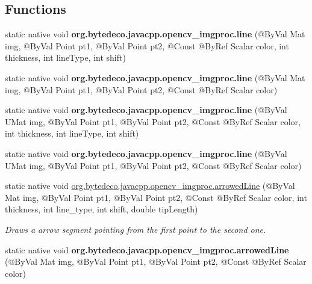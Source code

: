 \subsection*{Functions}
\begin{DoxyCompactItemize}
\item 
\mbox{\label{group__imgproc__draw_ga09dfe9f2e6b788aa42a900719ec2bb80}} 
static native void {\bfseries org.\+bytedeco.\+javacpp.\+opencv\+\_\+imgproc.\+line} (@By\+Val Mat img, @By\+Val Point pt1, @By\+Val Point pt2, @Const @By\+Ref Scalar color, int thickness, int line\+Type, int shift)
\item 
\mbox{\label{group__imgproc__draw_ga9332d09ef0ec098c1bfa58e6f517581f}} 
static native void {\bfseries org.\+bytedeco.\+javacpp.\+opencv\+\_\+imgproc.\+line} (@By\+Val Mat img, @By\+Val Point pt1, @By\+Val Point pt2, @Const @By\+Ref Scalar color)
\item 
\mbox{\label{group__imgproc__draw_ga4e4da35ed5a3bceec6408c2d527955c7}} 
static native void {\bfseries org.\+bytedeco.\+javacpp.\+opencv\+\_\+imgproc.\+line} (@By\+Val U\+Mat img, @By\+Val Point pt1, @By\+Val Point pt2, @Const @By\+Ref Scalar color, int thickness, int line\+Type, int shift)
\item 
\mbox{\label{group__imgproc__draw_ga9bfe92fd25b7e3b758bc8e4c0db3a97a}} 
static native void {\bfseries org.\+bytedeco.\+javacpp.\+opencv\+\_\+imgproc.\+line} (@By\+Val U\+Mat img, @By\+Val Point pt1, @By\+Val Point pt2, @Const @By\+Ref Scalar color)
\item 
static native void \hyperlink{group__imgproc__draw_gae4f0557739b8a995e8297d30b3d8a00c}{org.\+bytedeco.\+javacpp.\+opencv\+\_\+imgproc.\+arrowed\+Line} (@By\+Val Mat img, @By\+Val Point pt1, @By\+Val Point pt2, @Const @By\+Ref Scalar color, int thickness, int line\+\_\+type, int shift, double tip\+Length)
\begin{DoxyCompactList}\small\item\em Draws a arrow segment pointing from the first point to the second one. \end{DoxyCompactList}\item 
\mbox{\label{group__imgproc__draw_gac9b6e58c7decc1c1db29c7047dfb4ef0}} 
static native void {\bfseries org.\+bytedeco.\+javacpp.\+opencv\+\_\+imgproc.\+arrowed\+Line} (@By\+Val Mat img, @By\+Val Point pt1, @By\+Val Point pt2, @Const @By\+Ref Scalar color)

\end{DoxyCompactItemize}
